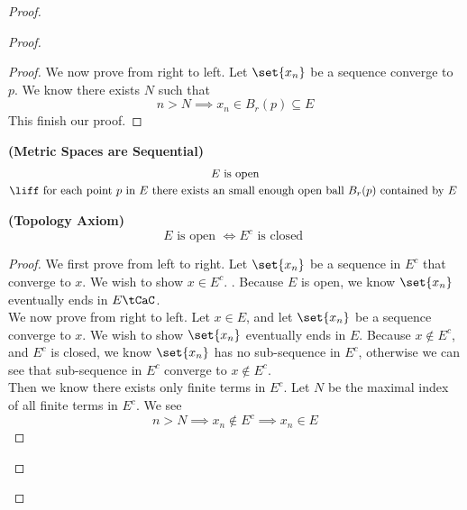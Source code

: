 \documentclass{report}
\begin{document}
\begin{proof}
\begin{proof}
\begin{proof}
We now prove from right to left. Let $\set{x_n}$ be a sequence converge to $p$. We know there exists $N$ such that
\begin{equation*}
n>N\implies x_n\in B_r(p)\subseteq E
\end{equation*}
This finish our proof.
\end{proof}
\begin{corollary}
\label{3.3.11}
\textbf{(Metric Spaces are Sequential)} 
\begin{gather*}
\text{ $E$ is open  }\\
\liff \text{ for each point  $p$ in  $E$ there exists an small enough open ball $B_r(p)$ contained by $E$ }
\end{gather*}
\end{corollary}
\begin{theorem}
\label{3.3.12}
\textbf{(Topology Axiom)}
\begin{equation*}
E\text{ is open  }\iff E^c\text{ is closed }
\end{equation*}
\end{theorem}
\begin{proof}
We first prove from left to right. Let $\set{x_n}$ be a sequence in $E^c$ that converge to $x$. We wish to show  $x\in E^c$. . Because $E$ is open, we know $\set{x_n}$ eventually ends in $E\tCaC$.\\

We now prove from right to left. Let $x\in E$, and let $\set{x_n}$ be a sequence converge to $x$. We wish to show  $\set{x_n}$ eventually ends in $E$. Because  $x\not \in E^c$, and $E^c$ is closed, we know  $\set{x_n}$ has no sub-sequence in  $E^c$, otherwise we can see that sub-sequence in $E^c$ converge to  $x\not\in E^c$.\\

Then we know there exists only finite terms in $E^c$. Let $N$ be the maximal index of all finite terms in  $E^c$. We see
 \begin{equation*}
n>N\implies x_n\not\in E^c\implies x_n\in E
\end{equation*}
\end{proof}

\end{proof}
\end{proof}
\end{document}

